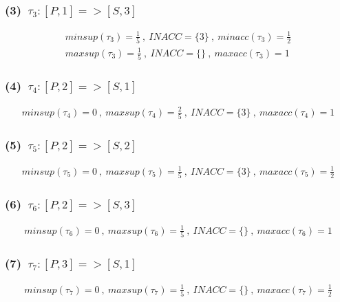 \documentclass[a4paper,12pt]{jarticle}
\begin{document}
\subsubsection*{(3)~$\tau_3:[P,1]=>[S,3]$}
\vspace{-4mm}
%
\begin{align*}
 minsup(\tau_3)=\frac{1}{5}~,~INACC=\{3\}~,~minacc(\tau_3)=\frac{1}{2}\\
 maxsup(\tau_3)=\frac{1}{5}~,~INACC=\{\}~,~maxacc(\tau_3)=1
\end{align*}
%
\vspace{-10mm}
\subsubsection*{(4)~$\tau_4:[P,2]=>[S,1]$}
\vspace{-4mm}
%
\begin{align*}
 minsup(\tau_4)=0~,~maxsup(\tau_4)=\frac{2}{5}~,~INACC=\{3\}~,~maxacc(\tau_4)=1
\end{align*}
%
\vspace{-10mm}
\subsubsection*{(5)~$\tau_5:[P,2]=>[S,2]$}
\vspace{-4mm}
%
\begin{align*}
 minsup(\tau_5)=0~,~maxsup(\tau_5)=\frac{1}{5}~,~INACC=\{3\}~,~maxacc(\tau_5)=\frac{1}{2}
\end{align*}
%
\vspace{-10mm}
\subsubsection*{(6)~$\tau_6:[P,2]=>[S,3]$}
\vspace{-4mm}
%
\begin{align*}
 minsup(\tau_6)=0~,~maxsup(\tau_6)=\frac{1}{5}~,~INACC=\{\}~,~maxacc(\tau_6)=1
\end{align*}
%
\vspace{-10mm}
\subsubsection*{(7)~$\tau_7:[P,3]=>[S,1]$}
\vspace{-4mm}
%
\begin{align*}
 minsup(\tau_7)=0~,~maxsup(\tau_7)=\frac{1}{5}~,~INACC=\{\}~,~maxacc(\tau_7)=\frac{1}{2}
\end{align*}
%
\vspace{-10mm}
\end{document}
